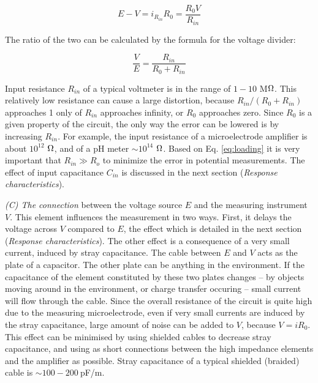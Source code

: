 \begin{equation}
\label{eq:loading}
	E - V = i_{R_{in}} R_0 = \frac{R_0 V}{R_{in}}
\end{equation}

The ratio of the two can be calculated by the formula for the voltage divider: 

\begin{equation}
\label{eq:loading2}
        \frac{V}{E} = \frac{R_{in}}{R_0+R_{in}}
\end{equation}

Input resistance $R_{in}$ of a typical voltmeter is in the range of $1-10$ M$\ohm$.
This relatively low resistance can cause a large distortion, because $R_{in}/(R_0+R_{in})$ approaches 1 only of $R_{in}$ approaches infinity, or $R_0$ approaches zero.
Since $R_0$ is a given property of the circuit, the only way the error can be lowered is by increasing $R_{in}$.
For example, the input resistance of a microelectrode amplifier is about $10^{12}$ $\ohm$, and of a pH meter $\sim 10^{14}$ $\ohm$.
Based on Eq. \ref{eq:loading} it is very important that $R_{in} \gg R_o$ to minimize the error in potential measurements.
The effect of input capacitance $C_{in}$ is discussed in the next section (\emph{Response characteristics}).

\emph{(C) The connection} between the voltage source $E$ and the measuring instrument $V$.
This element influences the measurement in two ways.
First, it delays the voltage across $V$ compared to $E$, the effect which is detailed in the next section (\emph{Response characteristics}).
The other effect is a consequence of a very small current, induced by stray capacitance.
The cable between $E$ and $V$ acts as the plate of a capacitor.
The other plate can be anything in the environment.
If the capacitance of the element constituted by these two plates changes -- by objects moving around in the environment, or charge transfer occuring -- small current will flow through the cable.
Since the overall resistance of the circuit is quite high due to the measuring microelectrode, even if very small currents are induced by the stray capacitance, large amount of noise can be added to $V$, because $V = iR_0$.
This effect can be minimised by using shielded cables to decrease stray capacitance, and using as short connections between the high impedance elements and the amplifier as possible.
Stray capacitance of a typical shielded (braided) cable is $\sim 100-200~$pF/m.

